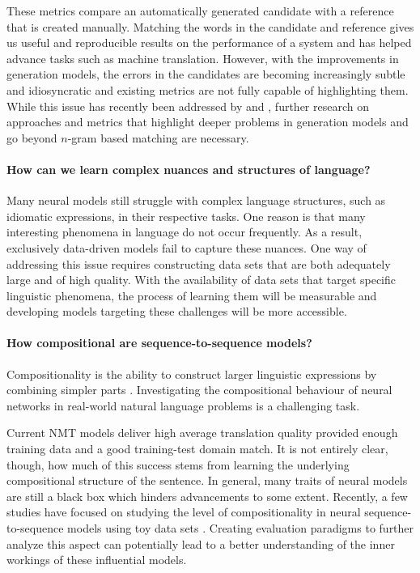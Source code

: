 These metrics compare an automatically generated candidate with a reference that is created manually. 
Matching the words in the candidate and reference gives us useful and reproducible results on the performance of a system and has helped advance tasks such as machine translation.
However, with the improvements in generation models, the errors in the candidates are becoming increasingly subtle and idiosyncratic and existing metrics are not fully capable of highlighting them.
While this issue has recently been addressed by \citet{chen-etal-2019-evaluating} and \citet{ribeiro-etal-2020-beyond}, further research on approaches and metrics that highlight deeper problems in generation models and go
beyond $n$-gram based matching are necessary. 
 
 
\paragraph{How can we learn complex nuances and structures of language?}

Many neural models still struggle with complex language structures, such as idiomatic expressions, in their respective tasks.
One reason is that many interesting phenomena in language do not occur frequently. 
As a result, exclusively data-driven models fail to capture these nuances. 
One way of addressing this issue requires constructing data sets that are both adequately large and of high quality. 
With the availability of data sets that target specific linguistic phenomena, the process of learning them will be measurable and developing models targeting these challenges will be more accessible.  

\paragraph{How compositional are sequence-to-sequence models?}

Compositionality is the ability to construct larger linguistic expressions by combining simpler parts \citep{Frege1892,fodor1992holism}.
Investigating the compositional behaviour of neural networks in real-world natural language problems is a challenging task. 

Current NMT models deliver high average translation quality provided enough training data and a good training-test domain match. It is not entirely clear, though, how much of this success stems from learning the underlying compositional structure of the sentence.
In general, many traits of neural models are still a black box which hinders advancements to some extent.  
Recently, a few studies have focused on studying the level of compositionality in neural sequence-to-sequence models using toy data sets \citep{DBLP:journals/corr/abs-1711-00350,ijcai2020-708}.
Creating evaluation paradigms to further analyze this aspect can potentially lead to a better understanding of the inner workings of these influential models.  






